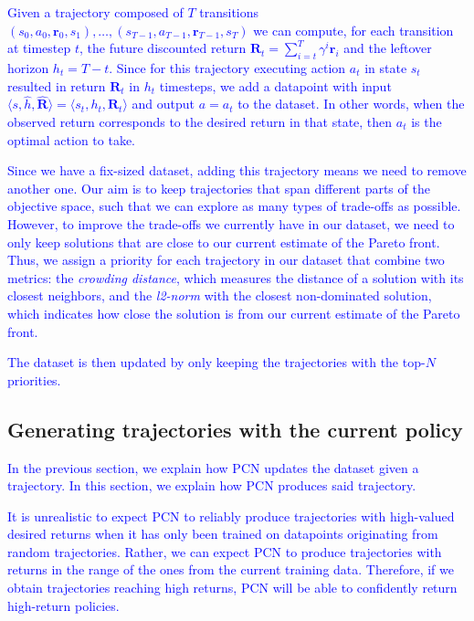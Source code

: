 \documentclass{article}
\newcommand\added[1]{\textcolor{blue}{#1}}
\begin{document}
\added{Given a trajectory composed of $T$ transitions $(s_0, a_0, \bm{r}_0, s_1), \dots, (s_{T-1}, a_{T-1}, \bm{r}_{T-1}, s_T)$ we can compute, for each transition at timestep $t$, the future discounted return $\bm{R}_t = \sum_{i=t}^T \gamma^i\bm{r}_i$ and the leftover horizon $h_t = T-t$. Since for this trajectory executing action $a_t$ in state $s_t$ resulted in return $\mathbf{R}_t$ in $h_t$ timesteps, we add a datapoint with input $\langle s, \hat{h}, \mathbf{\hat{R}}\rangle = \langle s_t, h_t, \mathbf{R}_t \rangle$ and output $a=a_t$ to the dataset. In other words, when the observed return corresponds to the desired return in that state, then $a_t$ is the optimal action to take.}

\added{Since we have a fix-sized dataset, adding this trajectory means we need to remove another one. Our aim is to keep trajectories that span different parts of the objective space, such that we can explore as many types of trade-offs as possible. However, to improve the trade-offs we currently have in our dataset, we need to only keep solutions that are close to our current estimate of the Pareto front. Thus, we assign a priority for each trajectory in our dataset that combine two metrics: the \emph{crowding distance}, which measures the distance of a solution with its closest neighbors, and the \emph{l2-norm} with the closest non-dominated solution, which indicates how close the solution is from our current estimate of the Pareto front.}

\added{The dataset is then updated by only keeping the trajectories with the top-$N$ priorities.}

\subsection{Generating trajectories with the current policy}
\label{sec:pcn-policy-exploration}

\added{In the previous section, we explain how PCN updates the dataset given a trajectory. In this section, we explain how PCN produces said trajectory.}

\added{It is unrealistic to expect PCN to reliably produce trajectories with high-valued desired returns when it has only been trained on datapoints originating from random trajectories. Rather, we can expect PCN to produce trajectories with returns in the range of the ones from the current training data. Therefore, if we obtain trajectories reaching high returns, PCN will be able to confidently return high-return policies.}
\end{document}
